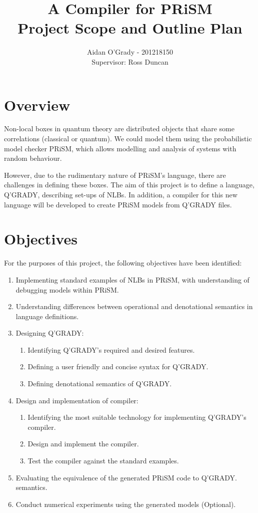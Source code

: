 \documentclass[11pt, a4paper]{article}
\begin{document}
\title{A Compiler for PRiSM \\
\large{Project Scope and Outline Plan}}
\author{Aidan O'Grady - 201218150\\Supervisor: Ross Duncan}
\date{}
\maketitle

\section{Overview} %
\label{sec:overview}
Non-local boxes in quantum theory are distributed objects that share some
correlations (classical or quantum). We could model them using the probabilistic
model checker PRiSM, which allows modelling and analysis of systems with random
behaviour.

However, due to the rudimentary nature of PRiSM's language, there are
challenges in defining these boxes. The aim of this project is to define a
language, Q'GRADY, describing set-ups of NLBs. In addition, a compiler for this
new language will be developed to create PRiSM models from Q'GRADY files.


\section{Objectives} %
\label{sec:objectives}
For the purposes of this project, the following objectives have been identified:
\begin{enumerate}
    \item Implementing standard examples of NLBs in PRiSM, with understanding of
    debugging models within PRiSM.
    \item Understanding differences between operational and denotational
    semantics in language definitions.
    \item Designing Q'GRADY:
    \begin{enumerate}
        \item Identifying Q'GRADY's required and desired features.
        \item Defining a user friendly and concise syntax for Q'GRADY.
        \item Defining denotational semantics of Q'GRADY.
    \end{enumerate}
    \item Design and implementation of compiler:
    \begin{enumerate}
        \item Identifying the most suitable technology for implementing
        Q'GRADY's compiler.
        \item Design and implement the compiler.
        \item Test the compiler against the standard examples.
    \end{enumerate}
    \item Evaluating the equivalence of the generated PRiSM code to Q'GRADY.
    semantics.
    \item Conduct numerical experiments using the generated models (Optional).
\end{enumerate}
\end{document}
